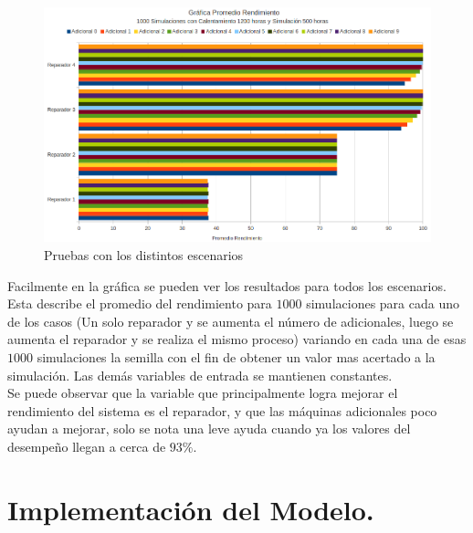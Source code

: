 \documentclass[12pt]{article}
\begin{document}
\begin{figure}[h]
  \centering
	\includegraphics[scale=0.5]{graf5.png} 
  \caption{Pruebas con los distintos escenarios}
  \label{fig:pruebas}
\end{figure}

Facilmente en la gr\'afica se pueden ver los resultados para todos los escenarios. Esta describe el promedio del rendimiento para $1000$ simulaciones para cada uno de los casos (Un solo reparador y se aumenta el n\'umero de adicionales, luego se aumenta el reparador y se realiza el mismo proceso) variando en cada una de esas $1000$ simulaciones la semilla con el fin de obtener un valor mas acertado a la simulaci\'on. Las dem\'as variables de entrada se mantienen constantes.\\

Se puede observar que la variable que principalmente logra mejorar el rendimiento del sistema es el reparador, y que las m\'aquinas adicionales poco ayudan a mejorar, solo se nota una leve ayuda cuando ya los valores del desempeño llegan a cerca de $93\%$. 

\section{Implementación del Modelo.}
\end{document}

